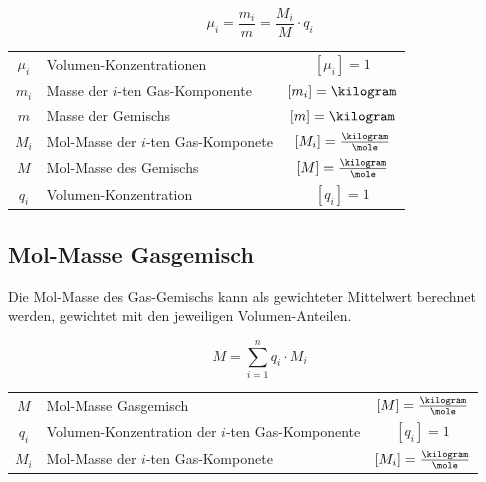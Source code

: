 \vspace{-0.2cm}

$$ \boxed{ \mu_i = \frac{m_i}{m} = \frac{M_i}{M} \cdot q_i } $$

\renewcommand{\arraystretch}{1.3}
\begin{tabular}{c l c}
	$\mu_i$ & Volumen-Konzentrationen 				& $[\mu_i] = 1$ 					\\
	$m_i$ 	& Masse der $i$-ten Gas-Komponente 		& $[m_i] = \kilogram$ 				\\
	$m$ 	& Masse der Gemischs 					& $[m] = \kilogram$ 				\\
	$M_i$ 	& Mol-Masse der $i$-ten Gas-Komponete 	& $[M_i] = \frac{\kilogram}{\mole}$ \\
	$M$ 	& Mol-Masse des Gemischs 				& $[M] = \frac{\kilogram}{\mole}$ 	\\
	$q_i$ 	& Volumen-Konzentration					& $[q_i] = 1$
\end{tabular}
\renewcommand{\arraystretch}{1}


\subsection{Mol-Masse Gasgemisch}

Die Mol-Masse des Gas-Gemischs kann als gewichteter Mittelwert berechnet werden, gewichtet mit den jeweiligen Volumen-Anteilen.

$$ \boxed{ M = \sum_{i=1}^n  q_i \cdot M_i } $$

\renewcommand{\arraystretch}{1.3}
\begin{tabular}{c l c}
	$M$ 	& Mol-Masse Gasgemisch								& $[M] = \frac{\kilogram}{\mole}$ 	\\
	$q_i$ 	& Volumen-Konzentration der $i$-ten Gas-Komponente	& $[q_i] = 1$ 						\\
	$M_i$ 	& Mol-Masse der $i$-ten Gas-Komponete 				& $[M_i] = \frac{\kilogram}{\mole}$
\end{tabular}
\renewcommand{\arraystretch}{1}


